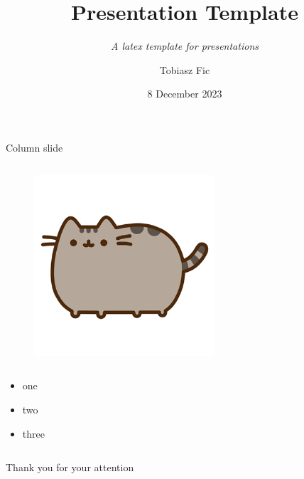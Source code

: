 

\title{Presentation Template}
    \subtitle{\textit{A latex template for presentations}}
\author{Tobiasz Fic}
\date{8 December 2023}



\begin{frame}
    \maketitle
\end{frame}

\begin{columnframe}{Column slide}
    \begin{column}{0.5\textwidth}
        \begin{figure}
            \centering
            \includegraphics[width=0.6\textwidth, frame]{images/pusheen.png}
        \end{figure}
    \end{column}
    \begin{column}{0.5\textwidth}
        \begin{itemize}
            \item one
            \item two
            \item three
        \end{itemize}
    \end{column}
\end{columnframe}

\begin{frame}{}
    \centering
    \Large{Thank you for your attention}
\end{frame}

